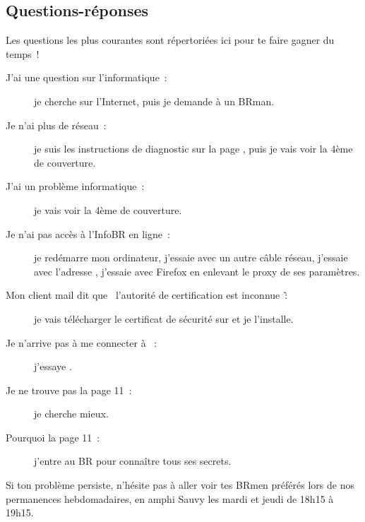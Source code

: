 \subsection{Questions-réponses}

Les questions les plus courantes sont répertoriées ici pour te faire gagner du temps~!

\begin{description}

\item[J'ai une question sur l'informatique~: ] je cherche sur l'Internet, puis je demande à un BRman.

\item[Je n'ai plus de réseau~: ] je suis les instructions de diagnostic sur la page \pageref{diagnostic}, puis je vais voir la 4ème de couverture.

\item[J'ai un problème informatique~: ] je vais voir la 4ème de couverture.

\item[Je n'ai pas accès à l'InfoBR en ligne~: ] je redémarre mon ordinateur, j'essaie avec un autre câble réseau, j'essaie avec l'adresse , j'essaie avec Firefox en enlevant le proxy de ses paramètres.

\item[Mon client mail dit que \og~l'autorité de certification est inconnue~\fg\~: ] je vais télécharger le certificat de sécurité
sur  et je l'installe.

\item[Je n'arrive pas à me connecter à ~: ] j'essaye .

\item[Je ne trouve pas la page 11~: ] je cherche mieux.

\item[Pourquoi la page 11~: ] j'entre au BR pour connaître tous ses secrets.

\end{description}

Si ton problème persiste, n'hésite pas à aller voir tes BRmen préférés lors de nos permanences hebdomadaires, en amphi Sauvy les mardi et jeudi de 18h15 à 19h15.
